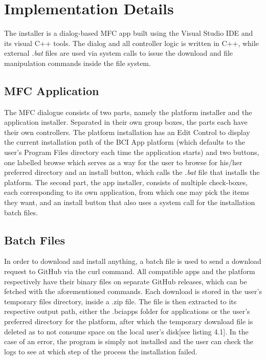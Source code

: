 \section{Implementation Details}
The installer is a dialog-based MFC app built using the Visual Studio IDE and its visual C++ tools. The dialog and all controller logic is written in C++, while external \textit{.bat} files are used via system calls to issue the download and file manipulation commands inside the file system.

\subsection{MFC Application}
The MFC dialogue consists of two parts, namely the platform installer and the application installer. Separated in their own group boxes, the parts each have their own controllers. The platform installation has an Edit Control to display the current installation path of the BCI App platform (which defaults to the user's Program Files directory each time the application starts) and two buttons, one labelled browse which serves as a way for the user to browse for his/her preferred directory and an install button, which calls the \textit{.bat} file that installs the platform. The second part, the app installer, consists of multiple check-boxes, each corresponding to its own application, from which one may pick the items they want, and an install button that also uses a system call for the installation batch files. 

\subsection{Batch Files}
In order to download and install anything, a batch file is used to send a download request to GitHub via the curl command. All compatible apps and the platform respectively have their binary files on separate GitHub releases, which can be fetched with the aforementioned commands. Each download is stored in the user's temporary files directory, inside a .zip file. The file is then extracted to its respective output path, either the .bciapps folder for applications or the user's preferred directory for the platform, after which the temporary download file is deleted as to not consume space on the local user's disk[see listing 4.1]. In the case of an error, the program is simply not installed and the user can check the logs to see at which step of the process the installation failed.

